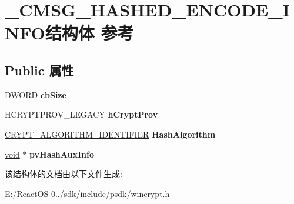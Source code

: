 \hypertarget{struct___c_m_s_g___h_a_s_h_e_d___e_n_c_o_d_e___i_n_f_o}{}\section{\+\_\+\+C\+M\+S\+G\+\_\+\+H\+A\+S\+H\+E\+D\+\_\+\+E\+N\+C\+O\+D\+E\+\_\+\+I\+N\+F\+O结构体 参考}
\label{struct___c_m_s_g___h_a_s_h_e_d___e_n_c_o_d_e___i_n_f_o}
\subsection*{Public 属性}
\begin{DoxyCompactItemize}
\item 
\mbox{\label{struct___c_m_s_g___h_a_s_h_e_d___e_n_c_o_d_e___i_n_f_o_a52b8d0018cda236d65eff20a5281c5f7}} 
D\+W\+O\+RD {\bfseries cb\+Size}
\item 
\mbox{\label{struct___c_m_s_g___h_a_s_h_e_d___e_n_c_o_d_e___i_n_f_o_a09076c9534659fac5ccdf76e03f8ad90}} 
H\+C\+R\+Y\+P\+T\+P\+R\+O\+V\+\_\+\+L\+E\+G\+A\+CY {\bfseries h\+Crypt\+Prov}
\item 
\mbox{\label{struct___c_m_s_g___h_a_s_h_e_d___e_n_c_o_d_e___i_n_f_o_a8777cc466d607636fffe9e6a2ac1f10f}} 
\hyperlink{struct___c_r_y_p_t___a_l_g_o_r_i_t_h_m___i_d_e_n_t_i_f_i_e_r}{C\+R\+Y\+P\+T\+\_\+\+A\+L\+G\+O\+R\+I\+T\+H\+M\+\_\+\+I\+D\+E\+N\+T\+I\+F\+I\+ER} {\bfseries Hash\+Algorithm}
\item 
\mbox{\label{struct___c_m_s_g___h_a_s_h_e_d___e_n_c_o_d_e___i_n_f_o_a7d5a95f8b5f3f0ec0078dbe2d73e571a}} 
\hyperlink{interfacevoid}{void} $\ast$ {\bfseries pv\+Hash\+Aux\+Info}
\end{DoxyCompactItemize}


该结构体的文档由以下文件生成\+:\begin{DoxyCompactItemize}
\item 
E\+:/\+React\+O\+S-\/0../sdk/include/psdk/wincrypt.\+h\end{DoxyCompactItemize}
